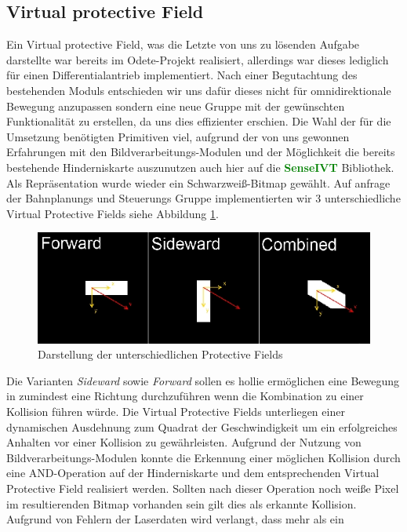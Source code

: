 \subsection{Virtual protective Field}
\label{sec:vpf}
Ein Virtual protective Field, was die Letzte von uns zu lösenden Aufgabe darstellte war bereits im Odete-Projekt
 realisiert, allerdings war dieses lediglich für einen Differentialantrieb implementiert.
 Nach einer Begutachtung des bestehenden Moduls entschieden wir uns dafür
 dieses nicht für omnidirektionale Bewegung anzupassen sondern eine neue Gruppe mit der gewünschten Funktionalität
 zu erstellen, da uns dies effizienter erschien. Die Wahl der für die Umsetzung benötigten Primitiven viel, aufgrund
 der von uns gewonnen Erfahrungen mit den Bildverarbeitungs-Modulen und der Möglichkeit die bereits bestehende
 Hinderniskarte auszunutzen auch hier auf die \textcolor{green}{\textbf{SenseIVT}}  Bibliothek.
 Als Repräsentation wurde wieder ein Schwarzweiß-Bitmap gewählt. Auf anfrage der Bahnplanungs und Steuerungs
 Gruppe implementierten wir 3 unterschiedliche Virtual Protective Fields siehe
 Abbildung \ref{fig:virtualprotectivefields}.
 \begin{figure}[h]
\center
\includegraphics[scale=0.5]{graphics/virtualprotectivefields.jpg}
\caption{\label{fig:virtualprotectivefields} Darstellung der unterschiedlichen Protective
Fields}
\end{figure}
 Die Varianten \emph{Sideward} sowie \emph{Forward} sollen es \gls{hollie}
 ermöglichen eine Bewegung in zumindest eine Richtung durchzuführen wenn die Kombination zu einer Kollision führen würde.
 Die Virtual Protective Fields unterliegen einer dynamischen Ausdehnung zum Quadrat der Geschwindigkeit
 um ein erfolgreiches Anhalten vor einer Kollision zu gewährleisten. Aufgrund der Nutzung von Bildverarbeitungs-Modulen
 konnte die Erkennung einer möglichen Kollision durch eine AND-Operation auf der Hinderniskarte und dem entsprechenden
 Virtual Protective Field realisiert werden. Sollten nach dieser Operation noch weiße Pixel im resultierenden Bitmap
 vorhanden sein gilt dies als erkannte Kollision. Aufgrund von Fehlern der Laserdaten wird verlangt, dass mehr als ein
